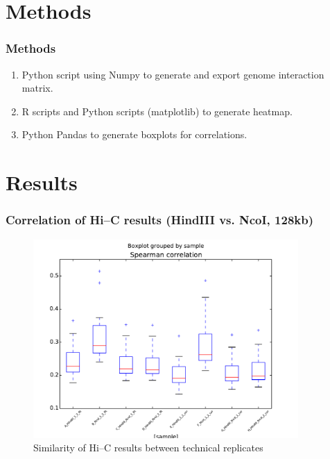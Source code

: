 \documentclass{beamer}
\begin{document}

\section{Methods} %
\label{sec:methods}

\begin{frame}
\frametitle{Methods}
\begin{enumerate}
	\item Python script using Numpy to generate 
	and export genome interaction matrix.
	\item R scripts and Python scripts (matplotlib)
	to generate heatmap.
	\item Python Pandas to generate boxplots
	for correlations. 
\end{enumerate}
\end{frame}



\section{Results} %
\label{sec:results}

\begin{frame}
\frametitle{ Correlation of Hi--C results (HindIII vs. NcoI, 128kb)}
\begin{figure}[tb]
	\begin{center}
		\includegraphics[width=0.9\textwidth]{./Figures/128_boxplot.pdf}
	\end{center}
	\caption{Similarity of Hi--C results between technical replicates}
	\label{fig:figure2}
\end{figure}
\end{frame}
\end{document}
